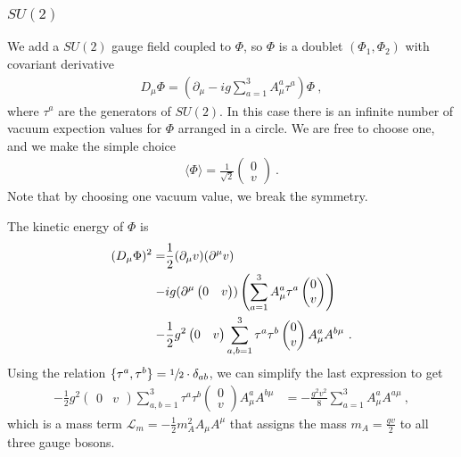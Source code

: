 \subsubsection{$SU(2)$}
We add a $SU(2)$ gauge field coupled to $\Phi$, so $\Phi$ is a doublet $(\Phi_1,\Phi_2)$ with covariant derivative
\begin{align}
	D_\mu\Phi = (\partial_\mu - ig\sum_{a=1}^3A_\mu^a\tau^a)\Phi \ ,
\end{align}
where $\tau^a$ are the generators of $SU(2)$. In this case there is an infinite number of vacuum expection values for $\Phi$ arranged in a circle. We are free to choose one, and we make the simple choice
\begin{align}
	\langle\Phi\rangle = \frac{1}{\sqrt{2}}\begin{pmatrix} 0 \\ v \end{pmatrix} \ .
\end{align}
Note that by choosing one vacuum value, we break the symmetry.


The kinetic energy of $\Phi$ is
\begin{align}
	(D_\mu\Phi)^2 = &\frac{1}{2}(\partial_\mu v)(\partial^\mu v)\notag \\
	- &ig(\partial^\mu\begin{pmatrix} 0 & v \end{pmatrix}) \left(\sum_{a=1}^3A_\mu^a\tau^a\begin{pmatrix} 0 \\ v \end{pmatrix}\right)\notag \\
	- &\frac{1}{2}g^2\begin{pmatrix} 0 & v \end{pmatrix}\sum_{a,b=1}^{3}\tau^a\tau^b\begin{pmatrix} 0 \\ v \end{pmatrix}A_\mu^aA^{b\mu} \ .
\end{align}
Using the relation $\{\tau^a,\tau^b\}=\sfrac{1}{2}\cdot\delta_{ab}$, we can simplify the last expression to get
\begin{align}
	- \frac{1}{2}g^2\begin{pmatrix} 0 & v \end{pmatrix}\sum_{a,b=1}^{3}\tau^a\tau^b\begin{pmatrix} 0 \\ v \end{pmatrix}A_\mu^aA^{b\mu} &= - \frac{g^2v^2}{8}\sum_{a=1}^{3}A_\mu^aA^{a\mu} \ ,
\end{align}
which is a mass term $\mathcal{L}_m = -\frac{1}{2}m_A^2A_\mu A^\mu$ that assigns the mass $m_A = \frac{gv}{2}$ to all three gauge bosons.

